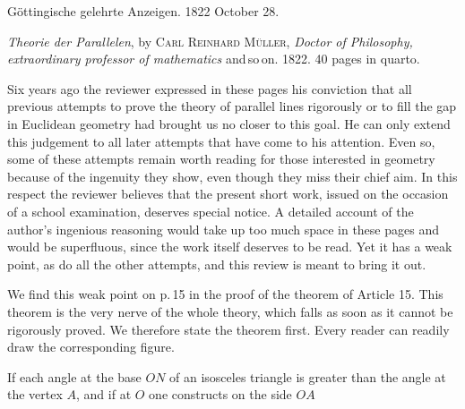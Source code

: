 \clearpage{}
\begin{center}
{\Large{}}
\end{center}

\bigskip
\noindent\hrulefill

\begin{center}
Göttingische gelehrte Anzeigen. 1822 October 28.
\end{center}

\noindent\hrulefill
\bigskip

\begin{center}
\end{center}

\emph{Theorie der Parallelen}, by \textsc{Carl Reinhard Müller}, \emph{Doctor of Philosophy, extraordinary professor of mathematics} and\,so\,on. 1822. 40 pages in quarto.

Six years ago the reviewer expressed in these pages his conviction that all previous attempts to prove the theory of parallel lines rigorously or to fill the gap in Euclidean geometry had brought us no closer to this goal. He can only extend this judgement to all later attempts that have come to his attention. Even so, some of these attempts remain worth reading for those interested in geometry because of the ingenuity they show, even though they miss their chief aim. In this respect the reviewer believes that the present short work, issued on the occasion of a school examination, deserves special notice. A detailed account of the author's ingenious reasoning would take up too much space in these pages and would be superfluous, since the work itself deserves to be read. Yet it has a weak point, as do all the other attempts, and this review is meant to bring it out.

We find this weak point on p.\,15 in the proof of the theorem of Article 15. This theorem is the very nerve of the whole theory, which falls as soon as it cannot be rigorously proved. We therefore state the theorem first. Every reader can readily draw the corresponding figure.

If each angle at the base $ON$ of an isosceles triangle is greater than the angle at the vertex $A$, and if at $O$ one constructs on the side $OA$
